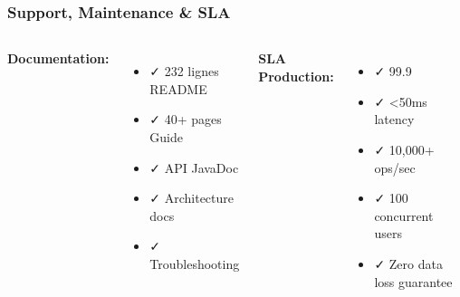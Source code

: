 \documentclass[aspectratio=16:9]{beamer}
\begin{document}
\begin{frame}[fragile]
  \frametitle{Support, Maintenance \& SLA}
  
  \centering
  
  \begin{columns}[T]
    
    \textbf{Documentation:}
    \begin{itemize}
      \item✓ 232 lignes README
      \item✓ 40+ pages Guide
      \item✓ API JavaDoc
      \item✓ Architecture docs
      \item✓ Troubleshooting
    \end{itemize}
    
    
    \textbf{SLA Production:}
    \begin{itemize}
      \item✓ 99.9%
      \item✓ <50ms latency
      \item✓ 10,000+ ops/sec
      \item✓ 100 concurrent users
      \item✓ Zero data loss guarantee
    \end{itemize}
  \end{columns}
  
  \vspace{1cm}
  
  \centering
\end{frame}

\end{document}
